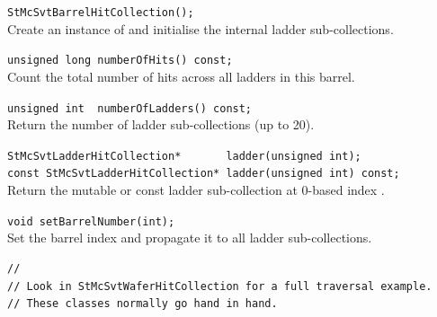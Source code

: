 \begin{Entry}
\item[Public\\ Constructors]
    \verb+StMcSvtBarrelHitCollection();+\\
    Create an instance of  and
    initialise the internal ladder sub-collections.

\item[Public Member\\ Functions]

    \verb+unsigned long numberOfHits() const;+\\
    Count the total number of hits across all ladders in this barrel.

    \verb+unsigned int  numberOfLadders() const;+\\
    Return the number of ladder sub-collections (up to 20).

    \verb+StMcSvtLadderHitCollection*       ladder(unsigned int);+\\
    \verb+const StMcSvtLadderHitCollection* ladder(unsigned int) const;+\\
    Return the mutable or const ladder sub-collection at 0-based index
    .

    \verb+void setBarrelNumber(int);+\\
    Set the barrel index and propagate it to all ladder sub-collections.

\item[Examples]
{\footnotesize
\begin{verbatim}
//
// Look in StMcSvtWaferHitCollection for a full traversal example.
// These classes normally go hand in hand.
\end{verbatim}
}%
\end{Entry}
\clearpage

\printindex


\bye

%
%

%
%
